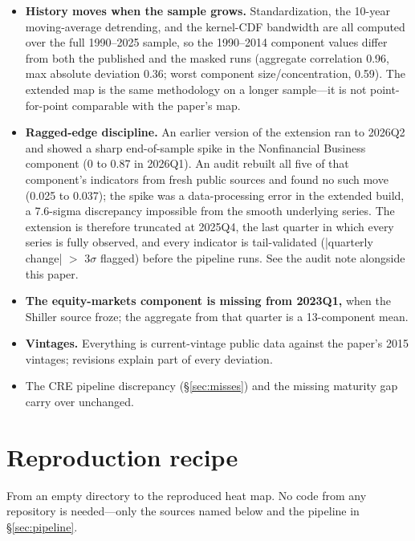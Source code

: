 \documentclass[11pt]{article}
\begin{document}
\begin{itemize}[nosep]
\item \textbf{History moves when the sample grows.}  Standardization,
the 10-year moving-average detrending, and the kernel-CDF bandwidth are
all computed over the full 1990--2025 sample, so the 1990--2014 component
values differ from both the published and the masked runs (aggregate
correlation 0.96, max absolute deviation 0.36; worst component
size/concentration, 0.59).  The extended map is the same methodology on
a longer sample---it is not point-for-point comparable with the
paper's map.
\item \textbf{Ragged-edge discipline.}  An earlier version of the extension
ran to 2026Q2 and showed a sharp end-of-sample spike in the Nonfinancial
Business component (0 to 0.87 in 2026Q1).  An audit rebuilt all five of
that component's indicators from fresh public sources and found no such
move (0.025 to 0.037); the spike was a data-processing error in the
extended build, a 7.6-sigma discrepancy impossible from the smooth
underlying series.  The extension is therefore truncated at 2025Q4, the
last quarter in which every series is fully observed, and every indicator
is tail-validated (|quarterly change| $>$ 3$\sigma$ flagged) before the
pipeline runs.  See the audit note alongside this paper.
\item \textbf{The equity-markets component is missing from 2023Q1,}
when the Shiller source froze; the aggregate from that quarter is a
13-component mean.
\item \textbf{Vintages.}  Everything is current-vintage public data
against the paper's 2015 vintages; revisions explain part of every
deviation.
\item The CRE pipeline discrepancy (\S\ref{sec:misses}) and the missing
maturity gap carry over unchanged.
\end{itemize}

\section{Reproduction recipe}
\label{sec:recipe}

From an empty directory to the reproduced heat map.  No code from any
repository is needed---only the sources named below and the pipeline in
\S\ref{sec:pipeline}.
\end{document}
